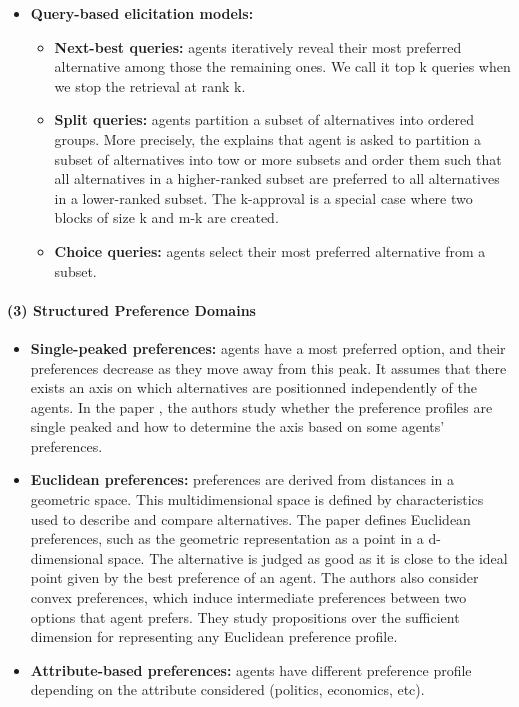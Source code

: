 \documentclass{article}
\begin{document}
\begin{itemize}
    \item \textbf{Query-based elicitation models:}
    \begin{itemize}
        \item \textbf{Next-best queries:} agents iteratively reveal their most preferred alternative among those the remaining ones. We call it top k queries when we stop the retrieval at rank k.
        \item \textbf{Split queries:} agents partition a subset of alternatives into ordered groups. More precisely, the \cite[Chapter 10]{brandt2016handbook} explains that agent is asked to partition a subset of alternatives into tow or more subsets and order them such that all alternatives in a higher-ranked subset are preferred to all alternatives in a lower-ranked subset. The k-approval is a special case where two blocks of size k and m-k are created.
        \item \textbf{Choice queries:} agents select their most preferred alternative from a subset.
    \end{itemize}
\end{itemize}

\paragraph{(3) Structured Preference Domains}

\begin{itemize}
    \item \textbf{Single-peaked preferences:} agents have a most preferred option, and their preferences decrease as they move away from this peak. It assumes that there exists an axis on which alternatives are positionned independently of the agents. In the paper \cite{escoffier2008single}, the authors study whether the preference profiles are single peaked and how to determine the axis based on some agents' preferences.
    \item \textbf{Euclidean preferences:} preferences are derived from distances in a geometric space. This multidimensional space is defined by characteristics used to describe and compare alternatives. The paper \cite{bogomolnaia2007euclidean} defines Euclidean preferences, such as the geometric representation as a point in a d-dimensional space. The alternative is judged as good as it is close to the ideal point given by the best preference of an agent. The authors also consider convex preferences, which induce intermediate preferences between two options that agent prefers. They study propositions over the sufficient dimension for representing any Euclidean preference profile.
    \item \textbf{Attribute-based preferences:} agents have different preference profile depending on the attribute considered (politics, economics, etc).
\end{itemize}
\end{document}
